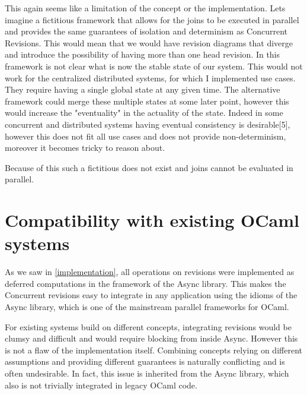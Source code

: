 \documentclass[12pt,twoside,notitlepage]{report}
\begin{document}
This again seems like a limitation of the concept or the implementation. Lets imagine a fictitious framework that allows for the joins to be executed in parallel and provides the same guarantees of isolation and determinism as Concurrent Revisions. This would mean that we would have revision diagrams that diverge and introduce the possibility of having more than one head revision. In this framework is not clear what is now the stable state of our system. This would not work for the centralized distributed systems, for which I implemented use cases. They require having a single global state at any given time. The alternative framework could merge these multiple states at some later point, however this would increase the "eventuality" in the actuality of the state. Indeed in some concurrent and distributed systems having eventual consistency is desirable[5], however this does not fit all use cases and does not provide non-determinism, moreover it becomes tricky to reason about.

Because of this such a fictitious does not exist and joins cannot be evaluated in parallel.      

\section{Compatibility with existing OCaml systems}
As we saw in \ref{implementation}, all operations on revisions were implemented as deferred computations in the framework of the Async library. This makes the Concurrent revisions easy to integrate in any application using the idioms of the Async library, which is one of the mainstream parallel frameworks for OCaml.

For existing systems build on different concepts, integrating revisions would be clumsy and difficult and would require blocking from inside Async. However this is not a flaw of the implementation itself. Combining concepts relying on different assumptions and providing different guarantees is naturally conflicting and is often undesirable. In fact, this issue is inherited from the Async library, which also is not trivially integrated in legacy OCaml code. 
\end{document}
